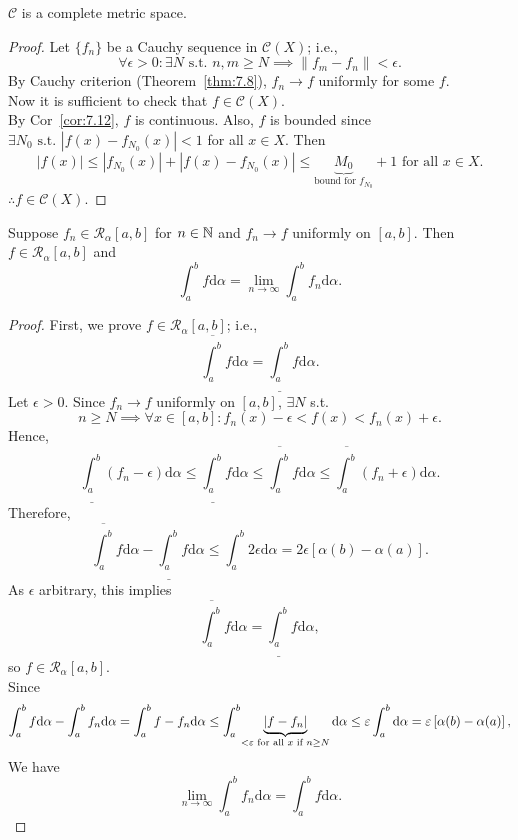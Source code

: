 \begin{thm}[15]
	$\mathscr{C}$ is a complete metric space.
	\begin{proof}
		Let $\{f_{n}\} $ be a Cauchy sequence in $\mathscr{C}(X)$; i.e., \[
			\forall{\epsilon > 0}: \exists N \text{ s.t. } n,m\ge N \implies \|f_{m}-f_{n}\| <\epsilon
			.\]
		By Cauchy criterion (Theorem~\ref{thm:7.8}), $f_{n}\to f$ uniformly for some $f$.\\
		Now it is sufficient to check that $f \in \mathscr{C}(X)$.\\
		By Cor~\ref{cor:7.12}, $f$ is continuous.
		Also, $f$ is bounded since $\exists{N_0} \text{ s.t. } \left|f(x)-f_{N_0}(x)\right| <1$ for all $x \in X$.
		Then \[
			\left|f(x)\right| \le \left|f_{N_0}(x)\right| +\left|f(x)-f_{N_0}(x)\right| \le \underbrace{M_0}_{\text{bound for $f_{N_0}$}}+1 \text{ for all } x \in X
			.\]
		$\therefore f \in \mathscr{C}(X)$.
	\end{proof}
\end{thm}

\begin{thm}[16]
	Suppose $f_{n} \in \mathscr{R}_{\alpha}[a,b]$ for $n \in \N$ and $f_{n}\to f$ uniformly on $[a,b]$.
	Then $f \in \mathscr{R}_{\alpha}[a,b]$ and \[
		\int_{a}^{b}{f\mathrm{d}\alpha}=\lim_{n\to \infty}{\int_{a}^{b}{f_{n}\mathrm{d}\alpha}}
		.\]
	\begin{proof}
		First, we prove $f \in \mathscr{R}_{\alpha}[a,b]$; i.e., \[
			\overline{\int_{a}^{b}}{f\mathrm{d}\alpha}=\underline{\int_{a}^{b}}{f\mathrm{d}\alpha}.\]
		Let $\epsilon>0$. Since $f_{n}\to f$ uniformly on $[a,b]$, $\exists{N}$ s.t. \[
			n\ge N \implies  \forall{x \in [a,b]}: f_{n}(x)-\epsilon<f(x)<f_{n}(x)+\epsilon.\]
		Hence,\[
			\underline{\int_{a}^{b}}{(f_{n}-\epsilon)\mathrm{d}\alpha} \le \underline{\int_{a}^{b}}{f\mathrm{d}\alpha}\le \overline{\int_{a}^{b}}{f\mathrm{d}\alpha}\le \overline{\int_{a}^{b}}{(f_{n}+\epsilon)\mathrm{d}\alpha}.\]
		Therefore,
		\[\overline{\int_{a}^{b}}{f\mathrm{d}\alpha}-\underline{\int_{a}^{b}}{f\mathrm{d}\alpha}\le \int_{a}^{b}{2 \epsilon\mathrm{d}\alpha}=2 \epsilon \left[ \alpha(b)-\alpha(a) \right].\]
		As $\epsilon$ arbitrary, this implies \[
			\overline{\int_{a}^{b}}{f\mathrm{d}\alpha}=\underline{\int_{a}^{b}}{f\mathrm{d}\alpha},\]
		so $f \in \mathscr{R}_{\alpha}[a,b]$.
		\\
		Since \[
			\int_{a}^{b}{f\mathrm{d}\alpha}-\int_{a}^{b}{f_{n}\mathrm{d}\alpha}= \int_{a}^{b}{f-f_n\mathrm{d}\alpha}\le {\int_{a}^{b}}{\underbrace{\left|f-f_{n}\right|}_{\small<\epsilon \text{ for all } x \text{ if } n\ge N } \mathrm{d}\alpha}\le \epsilon \int_{a}^{b}{\mathrm{d}\alpha}=\epsilon \left[ \alpha(b)-\alpha(a) \right]
			,\]
		We have
		\[
			\lim_{n\to \infty}{\int_{a}^{b}{f_{n}\mathrm{d}\alpha}}=\int_{a}^{b}{f\mathrm{d}\alpha}
			.\]
	\end{proof}
\end{thm}

